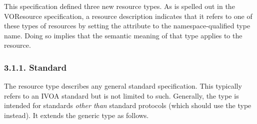 \documentclass[11pt,a4paper]{ivoa}
\begin{document}
This specification defined three new resource types.  As is spelled
out in the VOResource specification, a resource description indicates
that it refers to one of these types of resources by setting the
 attribute to the namespace-qualified type name.
Doing so implies that the semantic meaning of that type applies to the
resource.  



\subsubsection{3.1.1. Standard}

The  resource type describes any general
standard specification.  This typically refers to an IVOA standard but
is not limited to such.  Generally, the 
type is intended for standards \emph{other than} standard
protocols (which should use the  type
instead).  It extends the generic  type as
follows.  
\end{document}
